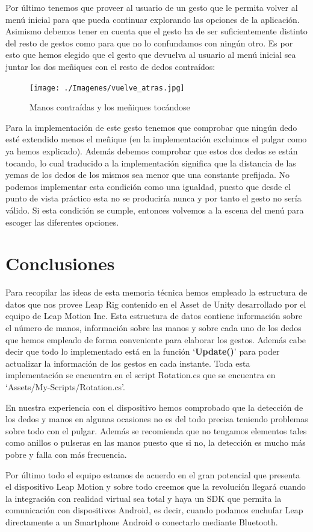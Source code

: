 \documentclass[a4paper,11pt]{article}
\begin{document}
Por último tenemos que proveer al usuario de un gesto que le permita volver al menú inicial para que pueda continuar explorando las opciones de la aplicación. Asimismo debemos tener en cuenta que el gesto ha de ser suficientemente distinto del resto de gestos como para que no lo confundamos con ningún otro. Es por esto que hemos elegido que el gesto que devuelva al usuario al menú inicial sea juntar los dos meñiques con el resto de dedos contraídos:

\begin{figure}[!h]
	\centering
	\texttt{[image: ./Imagenes/vuelve\_atras.jpg]}
	\caption{Manos contraídas y los meñiques tocándose}
	\label{gesto5}
\end{figure}

Para la implementación de este gesto tenemos que comprobar que ningún dedo esté extendido menos el meñique (en la implementación excluimos el pulgar como ya hemos explicado). Además debemos comprobar que estos dos dedos se están tocando, lo cual traducido a la implementación significa que la distancia de las yemas de los dedos de los mismos sea menor que una constante prefijada. No podemos implementar esta condición como una igualdad, puesto que desde el punto de vista práctico esta no se produciría nunca y por tanto el gesto no sería válido. Si esta condición se cumple, entonces volvemos a la escena del menú para escoger las diferentes opciones.

\section{Conclusiones}

Para recopilar las ideas de esta memoria técnica hemos empleado la estructura de datos que nos provee Leap Rig contenido en el Asset de Unity desarrollado por el equipo de Leap Motion Inc. Esta estructura de datos contiene información sobre el número de manos, información sobre las manos y sobre cada uno de los dedos que hemos empleado de forma conveniente para elaborar los gestos. Además cabe decir que todo lo implementado está en la función `\textbf{Update()}' para poder actualizar la información de los gestos en cada instante. Toda esta implementación se encuentra en el script Rotation.cs que se encuentra en `Assets/My-Scripts/Rotation.cs'.

\vspace{10px}

En nuestra experiencia con el dispositivo hemos comprobado que la detección de los dedos y manos en algunas ocasiones no es del todo precisa teniendo problemas sobre todo con el pulgar. Además se recomienda que no tengamos elementos tales como anillos o pulseras en las manos puesto que si no, la detección es mucho más pobre y falla con más frecuencia.

\vspace{10px}

Por último todo el equipo estamos de acuerdo en el gran potencial que presenta el dispositivo Leap Motion y sobre todo creemos que la revolución llegará cuando la integración con realidad virtual sea total y haya un SDK que permita la comunicación con dispositivos Android, es decir, cuando podamos enchufar Leap directamente a un Smartphone Android o conectarlo mediante Bluetooth. 
\end{document}
